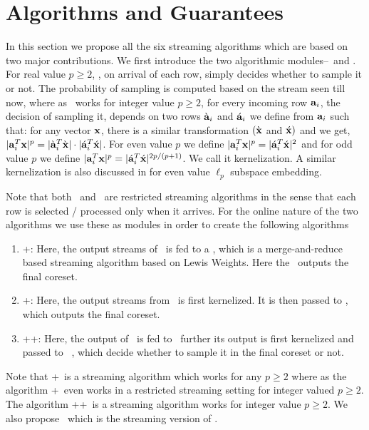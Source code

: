 \section{Algorithms and Guarantees}{\label{sec:algorithms}}
In this section we propose all the six streaming algorithms which are based on two major contributions. 
We first introduce the two algorithmic modules--\online~and . For real value $p \geq 2$, \online, on arrival of each row, simply decides whether to sample it or not. The probability of sampling is computed based on the stream seen till now,
% 
where as ~works for integer value $p \geq 2$, for every incoming row $\mathbf{a}_i$, the decision of sampling it, depends on two rows $\grave{\mathbf{a}}_{i}$ and $\acute{\mathbf{a}}_{i}$ we define from $\mathbf{a}_{i}$ such that: for any vector $\mathbf{x}$, there is a similar transformation $(\grave{\mathbf{x}}$ and $\acute{\mathbf{x}})$ and we get, $|\mathbf{a}_{i}^{T}\mathbf{x}|^{p}=|\grave{\mathbf{a}}_{i}^{T}\grave{\mathbf{x}}|\cdot|\acute{\mathbf{a}}_{i}^{T}\acute{\mathbf{x}}|$. For even value $p$ we define $|\mathbf{a}_{i}^{T}\mathbf{x}|^{p}=|\acute{\mathbf{a}}_{i}^{T}\acute{\mathbf{x}}|^{2}$ and for odd value $p$ we define $|\mathbf{a}_{i}^{T}\mathbf{x}|^{p}=|\acute{\mathbf{a}}_{i}^{T}\acute{\mathbf{x}}|^{2p/(p+1)}$. We call it kernelization. A similar kernelization is also discussed in \cite{schechtman2011tight} for even value $\ell_{p}$ subspace embedding.

Note that both \online~and ~are restricted streaming algorithms in the sense that each row is selected / processed only when it arrives. For the online nature of the two algorithms we use these as modules in order to create the following algorithms 
\begin{enumerate}
    \item \online+\mrlw: Here, the output streams of \online~is fed to a \mrlw, which is a merge-and-reduce based streaming algorithm based on Lewis Weights. Here the \mrlw~outputs the final coreset. 
    \item \online+: Here, the output streams from \online~is first kernelized. It is then passed to , which outputs the final coreset.
    \item \online+\mrlw+: Here, the output of \online~is fed to \mrlw~further its output is first kernelized and passed to ~, which decide whether to sample it in the final coreset or not.
\end{enumerate}
Note that \online+\mrlw~is a streaming algorithm which works for any $p \geq 2$ where as the algorithm \online+~even works in a restricted streaming setting for integer valued $p \geq 2$. The algorithm \online+\mrlw+~is a streaming algorithm works for integer value $p \geq 2$. We also propose \mrlf~which is the streaming version of \online.

